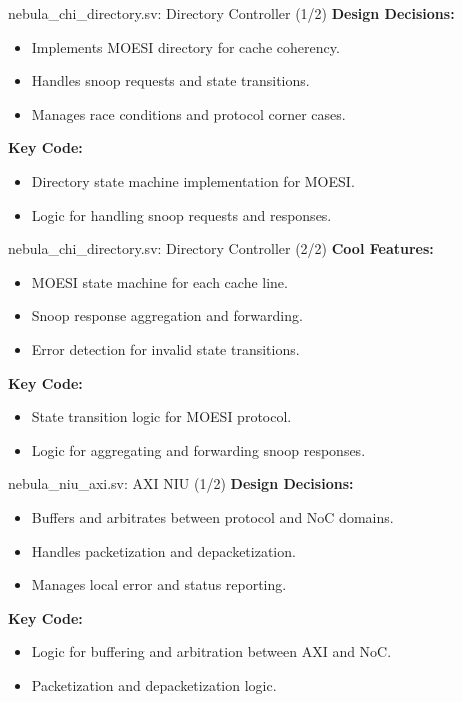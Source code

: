 \documentclass{beamer}
\begin{document}
\begin{frame}{nebula\_chi\_directory.sv: Directory Controller (1/2)}
  \textbf{Design Decisions:}
  \begin{itemize}
    \item Implements MOESI directory for cache coherency.
    \item Handles snoop requests and state transitions.
    \item Manages race conditions and protocol corner cases.
  \end{itemize}
  \textbf{Key Code:}
  \begin{itemize}
    \item Directory state machine implementation for MOESI.
    \item Logic for handling snoop requests and responses.
  \end{itemize}
\end{frame}

\begin{frame}{nebula\_chi\_directory.sv: Directory Controller (2/2)}
  \textbf{Cool Features:}
  \begin{itemize}
    \item MOESI state machine for each cache line.
    \item Snoop response aggregation and forwarding.
    \item Error detection for invalid state transitions.
  \end{itemize}
  \textbf{Key Code:}
  \begin{itemize}
    \item State transition logic for MOESI protocol.
    \item Logic for aggregating and forwarding snoop responses.
  \end{itemize}
\end{frame}

\begin{frame}{nebula\_niu\_axi.sv: AXI NIU (1/2)}
  \textbf{Design Decisions:}
  \begin{itemize}
    \item Buffers and arbitrates between protocol and NoC domains.
    \item Handles packetization and depacketization.
    \item Manages local error and status reporting.
  \end{itemize}
  \textbf{Key Code:}
  \begin{itemize}
    \item Logic for buffering and arbitration between AXI and NoC.
    \item Packetization and depacketization logic.
  \end{itemize}
\end{frame}
\end{document}

